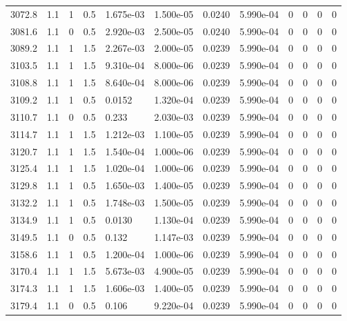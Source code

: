\documentclass[preview]{standalone}
\begin{document}
{{{{{{{{{{{{{\begin{tabular}{L{1.2cm}C{1.2cm} C{0.3cm}C{0.5cm} C{1.4cm}C{1.4cm} C{1.4cm}C{1.4cm} C{1.6cm}C{1.6cm} C{1.6cm}C{1.6cm}}
  3072.8  &   1.1  & 1     & 0.5 &  1.675e-03  & 1.500e-05  &  0.0240&   5.990e-04& 0 & 0   &  0 & 0  \\ 
  3081.6  &   1.1  & 0     & 0.5 &  2.920e-03  & 2.500e-05  &  0.0240&   5.990e-04& 0 & 0   &  0 & 0  \\ 
  3089.2  &   1.1  & 1     & 1.5 &  2.267e-03  & 2.000e-05  &  0.0239&   5.990e-04& 0 & 0   &  0 & 0  \\ 
  3103.5  &   1.1  & 1     & 1.5 &  9.310e-04  & 8.000e-06  &  0.0239&   5.990e-04& 0 & 0   &  0 & 0  \\ 
  3108.8  &   1.1  & 1     & 1.5 &  8.640e-04  & 8.000e-06  &  0.0239&   5.990e-04& 0 & 0   &  0 & 0  \\ 
  3109.2  &   1.1  & 1     & 0.5 &  0.0152  & 1.320e-04  &  0.0239&   5.990e-04& 0 & 0   &  0 & 0  \\ 
  3110.7  &   1.1  & 0     & 0.5 &  0.233  & 2.030e-03  &  0.0239&   5.990e-04& 0 & 0   &  0 & 0  \\ 
  3114.7  &   1.1  & 1     & 1.5 &  1.212e-03  & 1.100e-05  &  0.0239&   5.990e-04& 0 & 0   &  0 & 0  \\ 
  3120.7  &   1.1  & 1     & 1.5 &  1.540e-04  & 1.000e-06  &  0.0239&   5.990e-04& 0 & 0   &  0 & 0  \\ 
  3125.4  &   1.1  & 1     & 1.5 &  1.020e-04  & 1.000e-06  &  0.0239&   5.990e-04& 0 & 0   &  0 & 0  \\ 
  3129.8  &   1.1  & 1     & 0.5 &  1.650e-03  & 1.400e-05  &  0.0239&   5.990e-04& 0 & 0   &  0 & 0  \\ 
  3132.2  &   1.1  & 1     & 0.5 &  1.748e-03  & 1.500e-05  &  0.0239&   5.990e-04& 0 & 0   &  0 & 0  \\ 
  3134.9  &   1.1  & 1     & 0.5 &  0.0130  & 1.130e-04  &  0.0239&   5.990e-04& 0 & 0   &  0 & 0  \\ 
  3149.5  &   1.1  & 0     & 0.5 &  0.132  & 1.147e-03  &  0.0239&   5.990e-04& 0 & 0   &  0 & 0  \\ 
  3158.6  &   1.1  & 1     & 0.5 &  1.200e-04  & 1.000e-06  &  0.0239&   5.990e-04& 0 & 0   &  0 & 0  \\ 
  3170.4  &   1.1  & 1     & 1.5 &  5.673e-03  & 4.900e-05  &  0.0239&   5.990e-04& 0 & 0   &  0 & 0  \\ 
  3174.3  &   1.1  & 1     & 1.5 &  1.606e-03  & 1.400e-05  &  0.0239&   5.990e-04& 0 & 0   &  0 & 0  \\ 
  3179.4  &   1.1  & 0     & 0.5 &  0.106  & 9.220e-04  &  0.0239&   5.990e-04& 0 & 0   &  0 & 0  \\ 

\end{tabular}}}}}}}}}}}}}}
\end{document}
